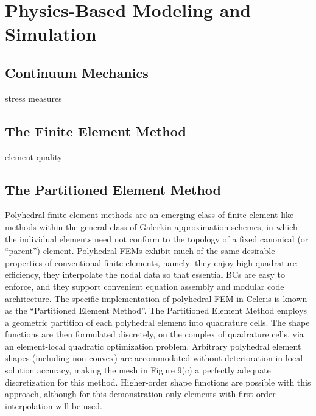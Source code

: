 \chapter{Physics-Based Modeling and Simulation}
\label{chap:4}
%
\section{Continuum Mechanics}
\label{Continuum Mechanics}

stress measures

\section{The Finite Element Method}
\label{The Finite Element Method}

element quality
\section{The Partitioned Element Method}
\label{The Partitioned Element Method}

Polyhedral finite element methods are an emerging class of finite-element-like methods within the general class of Galerkin approximation schemes, in which the individual elements need not conform to the topology of a fixed canonical (or “parent”) element. Polyhedral FEMs exhibit much of the same desirable properties of conventional finite elements, namely: they enjoy high quadrature efficiency, they interpolate the nodal data so that essential BCs are easy to enforce, and they support convenient equation assembly and modular code architecture. The specific implementation of polyhedral FEM in Celeris is known as the “Partitioned Element Method”. The Partitioned Element Method employs a geometric partition of each polyhedral element into quadrature cells. The shape functions are then formulated discretely, on the complex of quadrature cells, via an element-local quadratic optimization problem. Arbitrary polyhedral element shapes (including non-convex) are accommodated without deterioration in local solution accuracy, making the mesh in Figure 9(c) a perfectly adequate discretization for this method. Higher-order shape functions are possible with this approach, although for this demonstration only elements with first order interpolation will be used.

